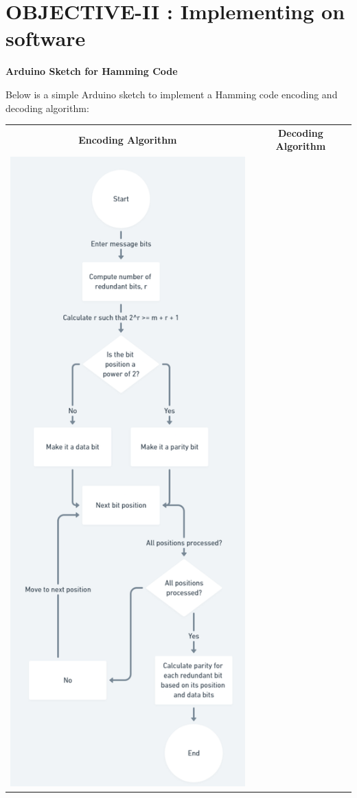\documentclass{article}
\begin{document}
\section{OBJECTIVE-II : Implementing on software}

\textbf{Arduino Sketch for Hamming Code}

Below is a simple Arduino sketch to implement a Hamming code encoding and decoding algorithm:\cite{beneater2018}


\begin{tabular}{cc}

\textbf{Encoding Algorithm} & \textbf{Decoding Algorithm} \\

       \includegraphics[scale=0.545]{encoding.png} 
       &
       


\end{tabular}
\end{document}
